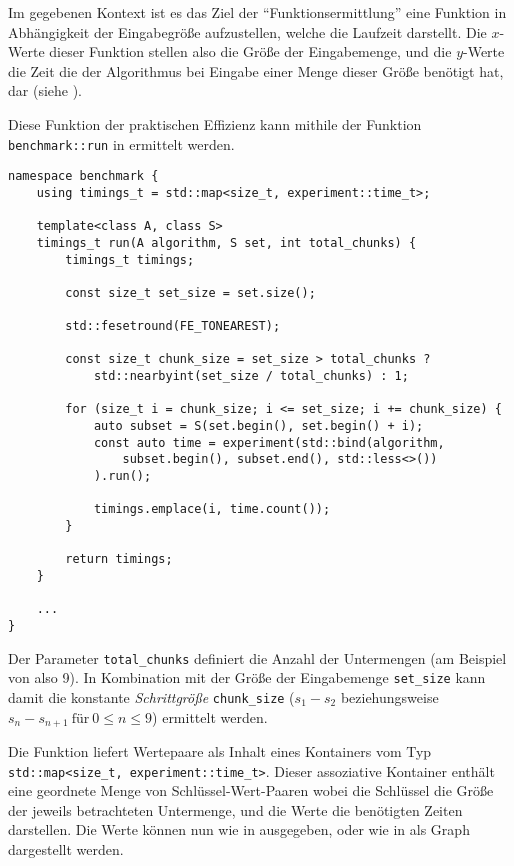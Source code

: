 Im gegebenen Kontext ist es das Ziel der \enquote{Funktionsermittlung} eine Funktion in Abhängigkeit der Eingabegröße aufzustellen, welche die Laufzeit darstellt. Die $x$-Werte dieser Funktion stellen also die Größe der Eingabemenge, und die $y$-Werte die Zeit die der Algorithmus bei Eingabe einer Menge dieser Größe benötigt hat, dar (siehe ).



Diese Funktion der praktischen Effizienz kann mithile der Funktion \linebreak[4]\lstinline{benchmark::run} in  ermittelt werden.

\begin{lstlisting}[label=lst:benchmark, caption={Implementation einer Funktion zur Ermittlung der praktischen Effizienz eines Algorotihmus mit einer bestimmenten Eingabemenge.}]
namespace benchmark {
	using timings_t = std::map<size_t, experiment::time_t>;

	template<class A, class S>
	timings_t run(A algorithm, S set, int total_chunks) {
		timings_t timings;

		const size_t set_size = set.size();

		std::fesetround(FE_TONEAREST);

		const size_t chunk_size = set_size > total_chunks ?
			std::nearbyint(set_size / total_chunks) : 1;

		for (size_t i = chunk_size; i <= set_size; i += chunk_size) {
			auto subset = S(set.begin(), set.begin() + i);
			const auto time = experiment(std::bind(algorithm,
				subset.begin(), subset.end(), std::less<>())
			).run();

			timings.emplace(i, time.count());
		}

		return timings;
	}
	
	...
}
\end{lstlisting}

Der Parameter \lstinline{total_chunks} definiert die Anzahl der Untermengen (am Beispiel von  also 9). In Kombination mit der Größe der Eingabemenge \lstinline{set_size} kann damit die konstante \emph{Schrittgröße} \lstinline{chunk_size} ($s_1 - s_2$ beziehungsweise $s_n - s_{n + 1}\ \text{für}\ 0 \leq n \le 9$) ermittelt werden.

Die Funktion liefert Wertepaare als Inhalt eines Kontainers vom Typ \lstinline{std::map<size_t, experiment::time_t>}. Dieser assoziative Kontainer enthält eine geordnete Menge von Schlüssel-Wert-Paaren wobei die Schlüssel die Größe der jeweils betrachteten Untermenge, und die Werte die benötigten Zeiten darstellen. Die Werte können nun wie in  ausgegeben, oder wie in  als Graph dargestellt werden.

